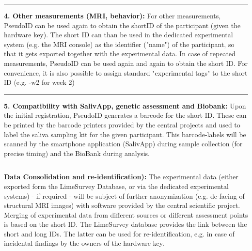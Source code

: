  \par\noindent\rule{\textwidth\color{pniblue}}{0.4pt}
 \textbf{4. Other measurements (MRI, behavior):}
 For other measurements, PseudoID can be used again to obtain the shortID of the participant (given the hardware key). The short ID can than be used in the dedicated experimental system (e.g. the MRI console) as the identifier ("name") of the participant, so that it gets exported together with the experimental data. In case of repeated measurements, PseudoID can be used again and again to obtain the short ID. For convenience, it is also possible to assign standard "experimental tags" to the short ID (e.g. -w2 for week 2)

\par\noindent\rule{\textwidth\color{pniblue}}{0.4pt} 
\textbf{5. Compatibility with SalivApp, genetic assessment and Biobank:} Upon the initial registration, PseudoID generates a barcode for the short ID. These can be printed by the barcode printers provided by the central projects and used to label the saliva sampling kit for the given participant. This barcode-labels will be scanned by the smartphone application (SalivApp) during sample collection (for precise timing) and the BioBank during analysis.

\par\noindent\rule{\textwidth\color{pniblue}}{0.4pt}
\textbf{Data Consolidation and re-identification):} The experimental data (either exported form the LimeSurvey Database, or via the dedicated experimental systems) - if required - will be subject of further anonymization (e.g. de-facing of structural MRI images) with software provided by the central scientific project. Merging of experimental data from different sources or different assessment points is based on the short ID. The LimeSurvey database provides the link between the short and long IDs. The latter can be used for re-identification, e.g. in case of incidental findings by the owners of the hardware key.
